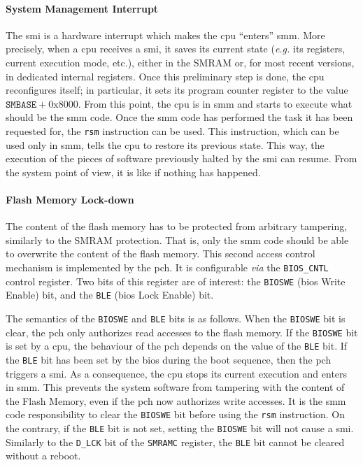 \paragraph{System Management Interrupt}

The \ac{smi} is a hardware interrupt which makes the \ac{cpu} ``enters''
\ac{smm}. 
%
More precisely, when a \ac{cpu} receives a \ac{smi}, it saves its current state
(\emph{e.g.} its registers, current execution mode, etc.), either in the SMRAM
or, for most recent versions, in dedicated internal registers. 
%
Once this preliminary step is done, the \ac{cpu} reconfigures itself;
%
in particular, it sets its program counter register to  the value
$\mathtt{SMBASE} + \mathrm{0x8000}$.
%
From this point, the \ac{cpu} is in \ac{smm} and starts to execute what should
be the \ac{smm} code.
%
Once the \ac{smm} code has performed the task it has been requested for, the
\texttt{rsm} instruction can be used.
%
This instruction, which can be used only in \ac{smm}, tells the \ac{cpu} to
restore its previous state.
%
This way, the execution of the pieces of software previously halted by the
\ac{smi} can resume.
%
From the system point of view, it is like if nothing has happened. 

\paragraph{Flash Memory Lock-down}
%
The content of the flash memory has to be protected from arbitrary tampering,
similarly to the SMRAM protection.
%
That is, only the \ac{smm} code should be able to overwrite the content of
the flash memory.
%
This second access control mechanism is implemented by the \ac{pch}.
%
It is configurable \emph{via} the \texttt{BIOS\_CNTL} control
register.
%
Two bits of this register are of interest: the \texttt{BIOSWE} (\ac{bios} Write
Enable) bit, and the \texttt{BLE} (\ac{bios} Lock Enable) bit.

The semantics of the \texttt{BIOSWE} and \texttt{BLE} bits is as follows.
%
When the \texttt{BIOSWE} bit is clear, the \ac{pch} only authorizes read accesses to
the flash memory.
%
If the \texttt{BIOSWE} bit is set by a \ac{cpu}, the behaviour of the \ac{pch}
depends on the value of the \texttt{BLE} bit.
%
If the \texttt{BLE} bit has been set by the \ac{bios} during the boot sequence,
then the \ac{pch} triggers a \ac{smi}.
%
As a consequence, the \ac{cpu} stops its current execution and enters in
\ac{smm}.
%
This prevents the system software from tampering with the content of the Flash
Memory, even if the \ac{pch} now authorizes write accesses.
%
It is the \ac{smm} code responsibility to clear the \texttt{BIOSWE} bit before
using the \texttt{rsm} instruction.
%
On the contrary, if the \texttt{BLE} bit is not set, setting the \texttt{BIOSWE}
bit will not cause a \ac{smi}.
%
Similarly to the \texttt{D\_LCK} bit of the \texttt{SMRAMC} register, the
\texttt{BLE} bit cannot be cleared without a reboot.

